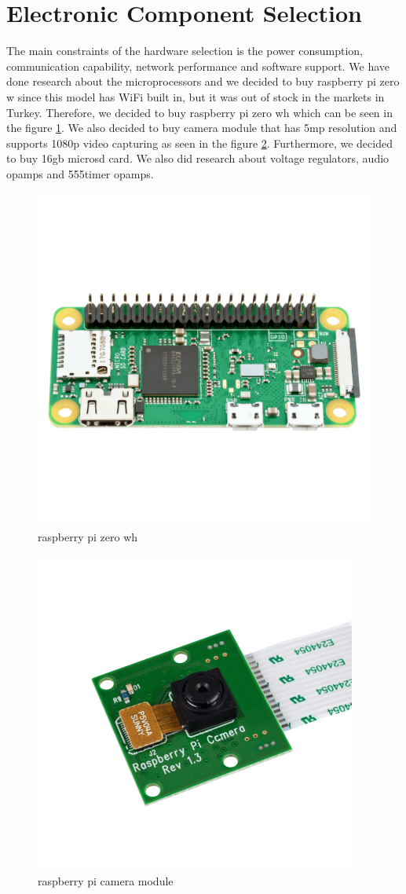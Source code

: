 \section{Electronic Component Selection} \label{sec:electronic}

The main constraints of the hardware selection is the power consumption, communication capability, network performance and software support. We have done research about the microprocessors and we decided to buy raspberry pi zero w since this model has WiFi built in, but it was out of stock in the markets in Turkey. Therefore, we decided to buy raspberry pi zero wh which can be seen in the figure \ref{fig:raspberry pi zero wh}. We also decided to buy camera module that has 5mp resolution and supports 1080p video capturing as seen in the figure \ref{fig:raspberry pi camera module}. Furthermore, we decided to buy 16gb microsd card. We also did research about voltage regulators, audio opamps and 555timer opamps.

\begin{figure}[h]
    \centering
    \includegraphics[width=.35\linewidth]{img/pizerowh.png}
    \caption{raspberry pi zero wh}
    \label{fig:raspberry pi zero wh}
\end{figure}

\begin{figure}[b]
    \centering
    \includegraphics[width=.35\linewidth]{img/picammodule.png}
    \caption{raspberry pi camera module}
    \label{fig:raspberry pi camera module}
\end{figure}





